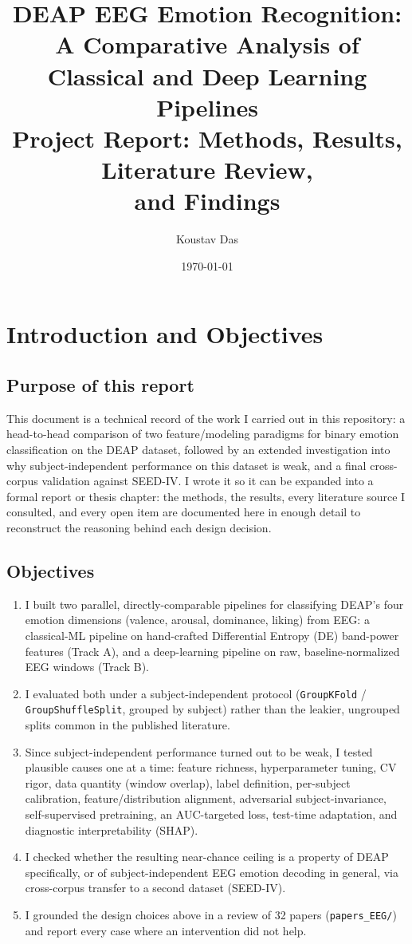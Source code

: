 \documentclass[11pt]{report}
\title{DEAP EEG Emotion Recognition: A Comparative Analysis of\\
Classical and Deep Learning Pipelines\\
\large Project Report: Methods, Results, Literature Review,\\
and Findings}
\author{Koustav Das}
\date{\today}
\begin{document}
\maketitle
\tableofcontents
\listoffigures
\listoftables

\chapter{Introduction and Objectives}

\section{Purpose of this report}
This document is a technical record of the work I carried out in this
repository: a head-to-head comparison of two feature/modeling paradigms for
binary emotion classification on the DEAP dataset, followed by an extended
investigation into why subject-independent performance on this dataset is
weak, and a final cross-corpus validation against SEED-IV. I wrote it so it
can be expanded into a formal report or thesis chapter: the methods, the
results, every literature source I consulted, and every open item are
documented here in enough detail to reconstruct the reasoning behind each
design decision.

\section{Objectives}
\begin{enumerate}
  \item I built two parallel, directly-comparable pipelines for classifying
        DEAP's four emotion dimensions (valence, arousal, dominance, liking)
        from EEG: a classical-ML pipeline on hand-crafted Differential
        Entropy (DE) band-power features (Track A), and a
        deep-learning pipeline on raw, baseline-normalized EEG windows
        (Track B).
  \item I evaluated both under a subject-independent
        protocol (\texttt{GroupKFold} / \texttt{GroupShuffleSplit}, grouped
        by subject) rather than the leakier, ungrouped splits common in the
        published literature.
  \item Since subject-independent performance turned out to be weak, I
        tested plausible causes one at a time: feature richness,
        hyperparameter tuning, CV rigor, data quantity (window overlap),
        label definition, per-subject calibration, feature/distribution
        alignment, adversarial subject-invariance, self-supervised
        pretraining, an AUC-targeted loss, test-time adaptation, and
        diagnostic interpretability (SHAP).
  \item I checked whether the resulting near-chance ceiling is a property of
        DEAP specifically, or of subject-independent EEG emotion decoding in
        general, via cross-corpus transfer to a second dataset (SEED-IV).
  \item I grounded the design choices above in a review of 32 papers
        (\texttt{papers\_EEG/}) and report every case where an intervention
        did not help.
\end{enumerate}
\end{document}
